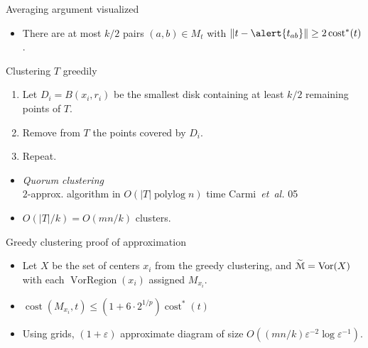 \documentclass[xcolor={dvipsnames,usenames},handout]{beamer} %
\newcommand{\mycite}[1]{{\color{violet}\lbrack #1\rbrack}}
\newcommand{\etal}{\textit{et~al.}}
\newcommand{\eps}{\varepsilon}
\DeclareMathOperator{\polylog}{polylog}
\DeclareMathOperator{\Vor}{Vor}
\DeclareMathOperator{\VorRegion}{VorRegion}
\def\abs#1{\mathopen| #1 \mathclose|}		%
\def\norm#1{\mathopen\| #1 \mathclose\|}	%
\DeclareMathOperator{\cost}{cost}
\newcommand{\tildeM}{\widetilde{\EuScript{M}}}
\def\EMPH#1{\textcolor{BrickRed}{{\emph{#1}}}}
\begin{document}
\begin{frame}{Averaging argument visualized}
\begin{itemize}
\item There are at most $k/2$ pairs $(a, b) \in M_t$ with $\norm{t-\alert{t_{ab}}} \geq 2\cost^*(t)$.
\end{itemize}
\end{frame}

\begin{frame}{Clustering $T$ greedily}
\begin{enumerate}
\item Let $D_i = B(x_i, r_i)$ be the smallest disk containing at least $k/2$ remaining points of $T$.
\item Remove from $T$ the points covered by $D_i$.
\item Repeat.
\end{enumerate}
\begin{itemize}
\item \EMPH{Quorum clustering}\\
	$2$-approx. algorithm in $O(\abs{T}\polylog n)$ time \mycite{Carmi~{\etal} 05}
\item $O(\abs{T}/k) = O(mn/k)$ clusters.
\end{itemize}
\end{frame}

\begin{frame}{Greedy clustering proof of approximation}
\begin{itemize}
\item Let $X$ be the set of centers $x_i$ from the greedy clustering,
	and $\tildeM = \Vor(X)$ with each $\VorRegion(x_i)$ assigned $M_{x_i}$.
\end{itemize}
\begin{itemize}
\item $\cost(M_{x_i}, t) \leq (1+6\cdot 2^{1/p}) \cost^*(t)$
\item Using grids, $(1+\eps)$ approximate diagram of size
	$O((mn/k) \eps^{-2}\log \eps^{-1})$.
\end{itemize}
\end{frame}
\end{document}
